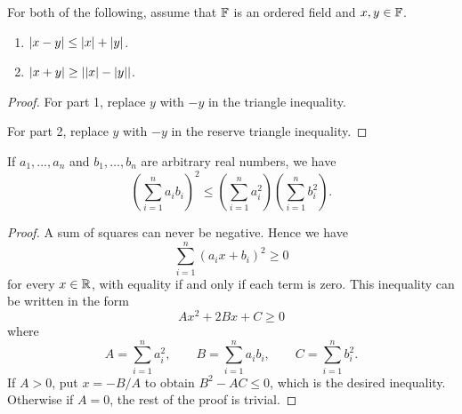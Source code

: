 \documentclass[11pt,twoside=off,numbers=noenddot]{scrbook}
\begin{document}
\begin{corollary}
    For both of the following, assume that $\mathbb F$ is an ordered field and $x, y \in \mathbb F$.
    \begin{enumerate}
        \item $| x - y | \leq | x | + | y |$.
        \item $| x + y | \geq | | x | - | y | |$.
    \end{enumerate}
\end{corollary}

\begin{proof}
    \phantom{.}

    For part 1, replace $y$ with $-y$ in the triangle inequality.

    For part 2, replace $y$ with $-y$ in the reserve triangle inequality.
\end{proof}

\begin{theorem}
    If $a_1, \dots, a_n$ and $b_1, \dots, b_n$ are arbitrary real numbers, we have
    \[ \left(\sum_{i = 1}^{n} a_i b_i\right)^2 \leq \left(\sum_{i = 1}^{n} a_i^2\right) \left(\sum_{i  = 1}^{n} b_i^2\right). \]
\end{theorem}

\begin{proof}
    A sum of squares can never be negative. Hence we have
    \[ \sum_{i = 1}^{n} (a_i x + b_i)^2 \geq 0 \]
    for every $x \in \mathbb R$, with equality if and only if each term is zero. This inequality can be written in the form
    \[ Ax^2 + 2Bx + C \geq 0 \]
    where
    \[ A = \sum_{i = 1}^{n} a_i^2, \qquad B = \sum_{i = 1}^n a_i b_i, \qquad C = \sum_{i = 1}^{n} b_i^2. \]
    If $A > 0$, put $x = -B/A$ to obtain $B^2 - AC \leq 0$, which is the desired inequality. Otherwise if $A = 0$, the rest of the proof is trivial.
\end{proof}
\end{document}

